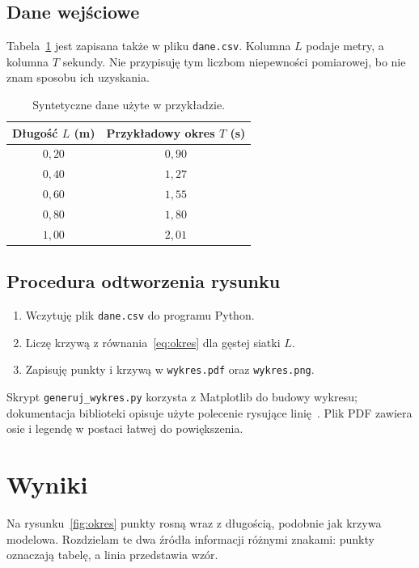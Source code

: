 \documentclass[a4paper,11pt]{article}
\begin{document}
\subsection{Dane wejściowe}
Tabela~\ref{tab:dane} jest zapisana także w pliku \texttt{dane.csv}.
Kolumna $L$ podaje metry, a kolumna $T$ sekundy. Nie przypisuję tym
liczbom niepewności pomiarowej, bo nie znam sposobu ich uzyskania.

\begin{table}[htbp]
  \centering
  \begin{tabular}{cc}
    \toprule
    Długość $L$ (m) & Przykładowy okres $T$ (s) \\
    \midrule
    $0{,}20$ & $0{,}90$ \\
    $0{,}40$ & $1{,}27$ \\
    $0{,}60$ & $1{,}55$ \\
    $0{,}80$ & $1{,}80$ \\
    $1{,}00$ & $2{,}01$ \\
    \bottomrule
  \end{tabular}
  \caption{Syntetyczne dane użyte w przykładzie.}
  \label{tab:dane}
\end{table}

\subsection{Procedura odtworzenia rysunku}
\begin{enumerate}
  \item Wczytuję plik \texttt{dane.csv} do programu Python.
  \item Liczę krzywą z równania~\eqref{eq:okres} dla gęstej siatki $L$.
  \item Zapisuję punkty i krzywą w \texttt{wykres.pdf} oraz
        \texttt{wykres.png}.
\end{enumerate}
Skrypt \texttt{generuj\_wykres.py} korzysta z Matplotlib do budowy
wykresu; dokumentacja biblioteki opisuje użyte polecenie rysujące
linię~\cite{matplotlib_plot}. Plik PDF zawiera osie i legendę w postaci
łatwej do powiększenia.

\section{Wyniki}\label{sec:wyniki}
Na rysunku~\ref{fig:okres} punkty rosną wraz z długością, podobnie jak
krzywa modelowa. Rozdzielam te dwa źródła informacji różnymi znakami:
punkty oznaczają tabelę, a linia przedstawia wzór.
\end{document}
